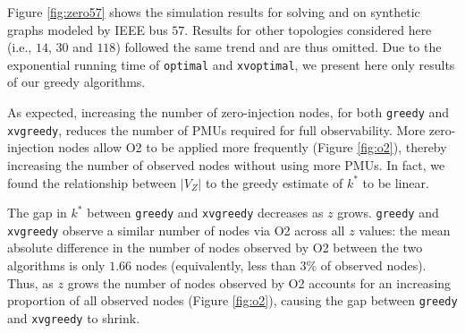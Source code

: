 Figure \ref{fig:zero57} shows the simulation results for solving \full and \xval on synthetic graphs modeled by IEEE bus $57$. Results for other topologies considered here 
(i.e., $14$, $30$ and $118$) followed the same trend and are thus omitted. Due to the exponential running time of {\tt optimal} and {\tt xvoptimal}, we present here only results of our 
greedy algorithms. 

As expected, increasing the number of zero-injection nodes, for both {\tt greedy} and {\tt xvgreedy}, reduces the number of PMUs required for 
full observability. 
More zero-injection nodes allow O2 to be applied more frequently (Figure \ref{fig:o2}), thereby increasing the number of observed nodes without using more PMUs.
In fact, we found the relationship between $|V_Z|$ to the greedy estimate of $k^*$  to be linear.

The gap in $k^*$ between {\tt greedy} and {\tt xvgreedy} decreases as $z$ grows. {\tt greedy} and {\tt xvgreedy} observe a similar
number of nodes via O2 across all $z$ values: the mean absolute difference in the number of nodes observed by O2 between the two algorithms is only $1.66$ nodes (equivalently, less
than $3\%$ of observed nodes).  
Thus, as $z$ grows the number of nodes observed by O2 accounts for an increasing proportion of all observed nodes (Figure \ref{fig:o2}), causing the gap between {\tt greedy} and {\tt xvgreedy} to shrink.



